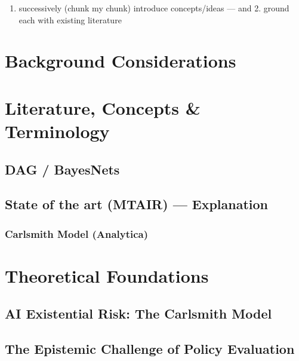 \documentclass[
  letterpaper,
]{book}
\providecommand{\tightlist}{%
  \setlength{\itemsep}{0pt}\setlength{\parskip}{0pt}}
\begin{document}
\begin{enumerate}
\def\labelenumi{\arabic{enumi}.}
\tightlist
\item
  successively (chunk my chunk) introduce concepts/ideas --- and 2.
  ground each with existing literature
\end{enumerate}

\section{Background Considerations}\label{background-considerations}

\section{Literature, Concepts \&
Terminology}\label{literature-concepts-terminology}

\subsection{DAG / BayesNets}\label{dag-bayesnets}

\subsection{State of the art (MTAIR) ---
Explanation}\label{state-of-the-art-mtair-explanation}

\subsubsection{Carlsmith Model
(Analytica)}\label{carlsmith-model-analytica}

\section{Theoretical Foundations}\label{theoretical-foundations}

\subsection{\texorpdfstring{\textbf{AI Existential Risk: The Carlsmith
Model}}{AI Existential Risk: The Carlsmith Model}}\label{ai-existential-risk-the-carlsmith-model}

\subsection{\texorpdfstring{\textbf{The Epistemic Challenge of Policy
Evaluation}}{The Epistemic Challenge of Policy Evaluation}}\label{the-epistemic-challenge-of-policy-evaluation}
\end{document}
